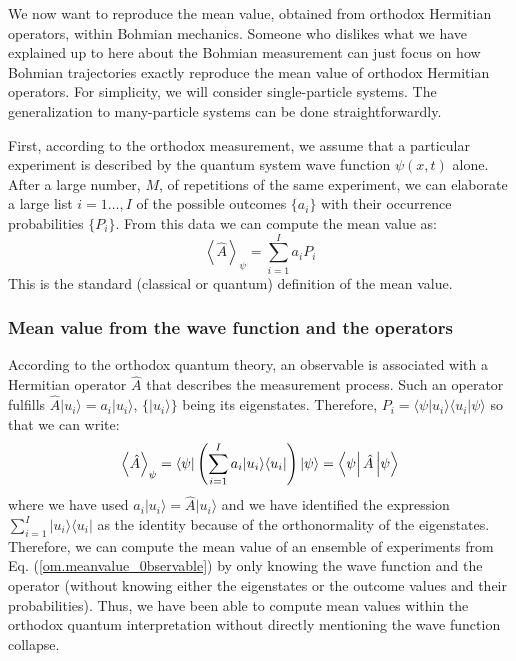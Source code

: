 \documentclass[nofootinbib, secnumarabic, amsmath, nobibnotes,10pt,aps,pra]{revtex4-1}
\newcommand{\ket}[1]{\ensuremath{|#1\rangle}}
\newcommand{\bra}[1]{\ensuremath{\langle#1|}}
\newcommand{\braket}[2]{\langle#1|#2\rangle}
\newcommand{\eref}[1]{Eq. (\ref{#1})}
\newcommand{\avg}[1]{\left\langle #1 \right\rangle} %
\newcommand{\matrixel}[3]{\left\langle #1 \vphantom{#2#3} \right|
#2 \left| #3 \vphantom{#1#2} \right\rangle} %
\begin{document}
We now want to reproduce the mean value, obtained from orthodox Hermitian
operators, within Bohmian mechanics. Someone who dislikes what we
have explained up to here about the Bohmian measurement can just
focus on how Bohmian trajectories exactly reproduce the mean value of orthodox
Hermitian operators. For simplicity, we will consider
single-particle systems. The generalization to many-particle systems
can be done straightforwardly.

First, according to the orthodox measurement, we assume that a particular experiment is described by the quantum system wave function $\psi(x,t)$ alone. After a large number, $M$, of repetitions of the same experiment, we can elaborate a large list $i = 1\ldots,I$ of the possible outcomes $\{a_i\}$ with their occurrence probabilities $\{P_i\}$. From this data we can compute the mean value as:
 \begin{equation}
 \label{om.meanvalue_probability}
 \avg{\hat{A}}_{\psi} = \sum_{i = 1}^{I}a_i P_i
 \end{equation}
This is the standard (classical or quantum) definition of the mean value.

\subsubsection{Mean value from the wave function and the operators}

According to the orthodox quantum theory, an observable is associated with a Hermitian operator $\hat{A}$ that describes the measurement process.
Such an operator fulfills $\hat{A} \ket{u_i} = a_i\ket{u_i}$, $\{\ket{u_i}\}$ being its eigenstates.
Therefore, $P_i = \braket{\psi}{u_i}\braket{u_i}{\psi}$ so that we can write:
 \begin{equation}
 \label{om.meanvalue_0bservable}
 \avg{\hat{A}}_{\psi} = \bra{\psi} \left( \sum_{i = 1}^{I}a_i \ket{u_i}\bra{u_i} \right) \ket{\psi} = \matrixel{\psi}{\hat{A}}{\psi}
\end{equation}
where we have used $a_i\ket{u_i} = \hat{A} \ket{u_i}$ and we have
identified the expression $\sum_{i = 1}^{I} \ket{u_i}\bra{u_i}$ as
the identity because of the orthonormality of the eigenstates.
Therefore, we can compute the mean value of an ensemble of
experiments from \eref{om.meanvalue_0bservable} by only knowing the
wave function and the operator (without knowing either the
eigenstates or the outcome values and their probabilities).  Thus, we have been able to compute
mean values within the orthodox quantum interpretation without
directly mentioning the wave function collapse.
\end{document}
